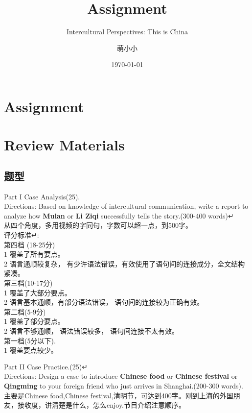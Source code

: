 \documentclass[12pt,lang=en,thmcnt=section]{elegantbook}
\title{Assignment}
\subtitle{Intercultural Perspectives: This is China}
\author{萌小小}
\institute{Shanghai University}
\date{\today}
\begin{document}
\maketitle
\frontmatter

\tableofcontents

\mainmatter

\chapter{Assignment}










\chapter{Review Materials}
\section*{题型}
Part I Case Analysis(25).\\
Directions: Based on knowledge of intercultural communication, write a report to analyze how \textbf{Mulan} or \textbf{Li Ziqi} successfully tells the story.(300-400 words)↵\\
从四个角度，多用视频的字同句，字数可以超一点，到500字。\\
评分标准↵:\\
第四档 (18-25分)\\
1 覆盖了所有要点。\\
2 语言通顺较复杂， 有少许语法错误，有效使用了语句间的连接成分，全文结构紧凑。\\
第三档(10-17分)\\
1 覆盖了大部分要点。\\
2 语言基本通顺，有部分语法错误， 语句间的连接较为正确有效。\\
第二档(5-9分)\\
1 覆盖了部分要点。\\
2 语言不够通顺， 语法错误较多， 语句间连接不太有效。\\
第一档(5分以下).\\
1 覆盖要点较少。

Part II Case Practice.(25)↵\\
Directions: Design a case to introduce \textbf{Chinese food} or \textbf{Chinese festival} or \textbf{Qingming} to your foreign friend who just arrives in Shanghai.(200-300 words).\\
主要是Chinese food,Chinese festival,清明节，可达到400字。刚到上海的外国朋友，接收度，讲清楚是什么，怎么enjoy.节目介绍注意顺序。
\end{document}
